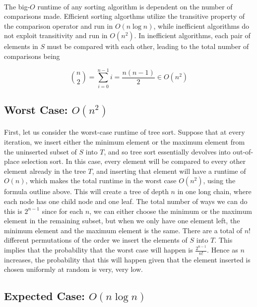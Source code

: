 \documentclass{article}
\begin{document}
\paragraph{} The big-$O$ runtime of any sorting algorithm is dependent on the number of comparisons made. Efficient sorting algorthms utilize the transitive property of the comparison operator and run in $O(n \log n)$, while inefficient algorithms do not exploit transitivity and run in $O(n^2)$. In inefficient algorithms, each pair of elements in $S$ must be compared with each other, leading to the total number of comparisons being

$$ {n \choose 2} = \sum_{i=0}^{n-1} i = \frac{n(n-1)}{2} \in O(n^2)$$

\subsection{Worst Case: $O(n^2)$}

\paragraph{} First, let us consider the worst-case runtime of tree sort. Suppose that at every iteration, we insert either the minimum element or the maximum element from the uninserted subset of $S$ into $T$, and so tree sort essentially devolves into out-of-place selection sort. In this case, every element will be compared to every other element already in the tree $T$, and inserting that element will have a runtime of $O(n)$, which makes the total runtime in the worst case $O(n^2)$, using the formula outline above. This will create a tree of depth $n$ in one long chain, where each node has one child node and one leaf. The total number of ways we can do this is $2^{n-1}$ since for each $n$, we can either choose the minimum or the maximum element in the remaining subset, but when we only have one element left, the minimum element and the maximum element is the same. There are a total of $n!$ different permutations of the order we insert the elements of $S$ into $T$. This implies that the probability that the worst case will happen is $\frac{2^{n-1}}{n!}$. Hence as $n$ increases, the probability that this will happen given that the element inserted is chosen uniformly at random is very, very low.

\subsection{Expected Case: $O(n \log n)$}
\end{document}
